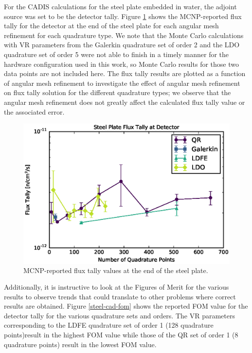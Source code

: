 \documentclass{article} %
\begin{document}
For the CADIS calculations for the steel plate embedded in water, the adjoint
source was set to be the detector tally. Figure \ref{steel-cad-tally} shows
the MCNP-reported flux tally for the detector at the end of the steel plate
for each angular mesh refinement for each quadrature type. We note that the
Monte Carlo calculations with VR parameters from the Galerkin quadrature
set of order 2 and the LDO quadrature set of order 5 were not able to finish
in a timely manner for the hardware configuration used in this work, so Monte
Carlo results for those two data points are not included here. The flux tally
results are plotted as a function of angular mesh refinement to investigate
the effect of angular mesh refinement on flux tally solution for the different
quadrature types; we observe that the angular mesh refinement does not greatly
affect the calculated flux tally value or the associated error.

\begin{figure}[!hbt]
\centering
\includegraphics[max height=0.445\textheight]{steel-cadis-tally.eps}
\caption{MCNP-reported flux tally values at the end of the steel plate.}
\label{steel-cad-tally}
\end{figure}

Additionally, it is instructive to look at the Figures of Merit for the
various results to observe trends that could translate to other problems where
correct results are obtained. Figure \ref{steel-cad-fom} shows the reported
FOM value for the detector tally for the various quadrature sets and orders.
The VR parameters corresponding to the LDFE quadrature set of order 1 (128
quadrature points)result in the highest FOM value while those of the QR set of
order 1 (8 quadrature points) result in the lowest FOM value.
\end{document}
